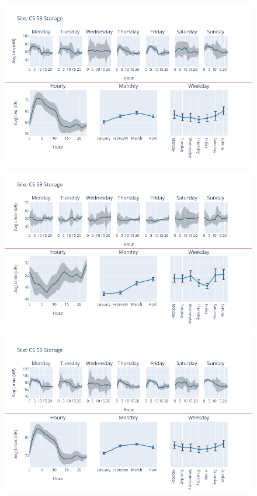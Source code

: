 \documentclass[12pt, oneside]{book}
\begin{document}
{ 
{\begin{figure}[H] 
 \centering 
\includegraphics[width=.88\textwidth, keepaspectratio]{image71} 
 \end{figure}}{} 

{\begin{figure}[H] 
 \centering 
\includegraphics[width=.88\textwidth, keepaspectratio]{image72} 
 \end{figure}}{} 

{\begin{figure}[H] 
 \centering 
\includegraphics[width=.88\textwidth, keepaspectratio]{image73} 
 \end{figure}}{} 

}
\end{document}
